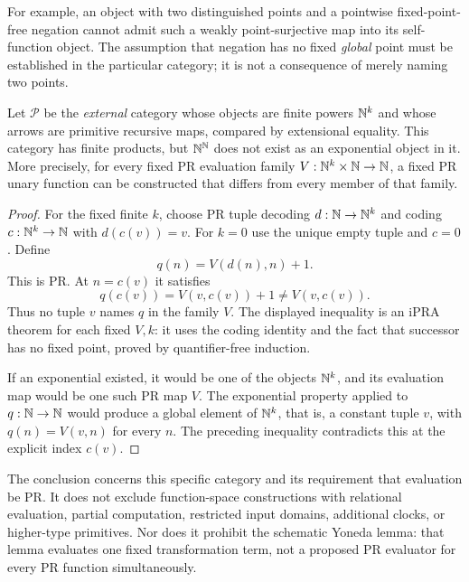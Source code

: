 For example, an object with two distinguished points and a pointwise
fixed-point-free negation cannot admit such a weakly point-surjective
map into its self-function object.  The assumption that negation has no
fixed \emph{global} point must be established in the particular category;
it is not a consequence of merely naming two points.

\begin{proposition}
Let $\mathcal P$ be the \emph{external} category whose objects are finite
powers $\mathbb{N}^k$ and whose arrows are primitive recursive maps, compared by
extensional equality.  This category has finite products, but $\mathbb{N}^{\mathbb{N}}$
does not exist as an exponential object in it.  More precisely, for every
fixed PR evaluation family $V:\mathbb{N}^k\times\mathbb{N}\to\mathbb{N}$, a fixed PR unary function
can be constructed that differs from every member of that family.
\end{proposition}
\begin{proof}
For the fixed finite $k$, choose PR tuple decoding
$d:\mathbb{N}\to\mathbb{N}^k$ and coding $c:\mathbb{N}^k\to\mathbb{N}$ with $d(c(v))=v$.
For $k=0$ use the unique empty tuple and $c=0$.
Define
\[
 q(n)=V(d(n),n)+1.
\]
This is PR.  At $n=c(v)$ it satisfies
\[
 q(c(v))=V(v,c(v))+1\ne V(v,c(v)).
\]
Thus no tuple $v$ names $q$ in the family $V$.  The displayed inequality
is an iPRA theorem for each fixed $V,k$: it uses the coding identity and
the fact that successor has no fixed point, proved by quantifier-free
induction.

If an exponential existed, it would be one of the objects $\mathbb{N}^k$, and
its evaluation map would be one such PR map $V$.  The exponential property
applied to $q:\mathbb{N}\to\mathbb{N}$ would produce a global element of $\mathbb{N}^k$, that is,
a constant tuple $v$, with $q(n)=V(v,n)$ for every $n$.  The preceding
inequality contradicts this at the explicit index $c(v)$.
\end{proof}

The conclusion concerns this specific category and its requirement that
evaluation be PR.  It does not exclude function-space constructions with
relational evaluation, partial computation, restricted input domains,
additional clocks, or higher-type primitives.  Nor does it prohibit the
schematic Yoneda lemma: that lemma evaluates one fixed transformation term,
not a proposed PR evaluator for every PR function simultaneously.

